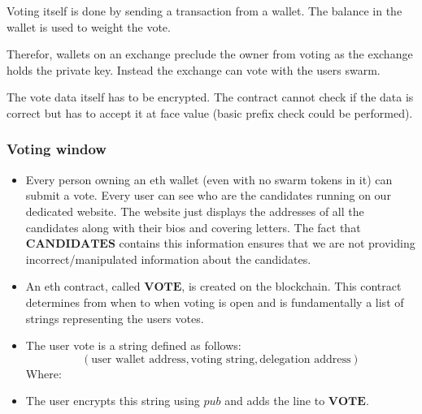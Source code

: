 \documentclass[submission, copyright,creativecommons,sharealike,noncommercial]{eptcs}
\begin{document}
			Voting itself is done by sending a transaction from a
			wallet. The balance in the wallet is used to weight the
			vote.

			Therefor, wallets on an exchange preclude the owner from
			voting as the exchange holds the private key. Instead the
			exchange can vote with the users swarm.

			The vote data itself has to be encrypted. The contract
			cannot check if the data is correct but has to accept
			it at face value (basic prefix check could be performed).

		\subsubsection{Voting window}
			\begin{itemize}
				\item Every person owning an eth wallet (even with no swarm tokens in it) can submit a vote. Every user can see who are the candidates running on our dedicated website. The website just displays the addresses of all the candidates along with their bios and covering letters. The fact that $\textbf{CANDIDATES}$ contains this information ensures that we are not providing incorrect/manipulated information about the candidates.
				
				\item An eth contract, called $\textbf{VOTE}$, is created on the blockchain. This contract determines from when to when voting is open and is fundamentally a list of strings representing the users votes.
				
				\item The user vote is a string defined as follows: 
				\[
				(\text{user wallet address}, \text{voting string}, \text{delegation address})
				\]
				Where:
			
				\item The user encrypts this string using $pub$ and adds the line to $\textbf{VOTE}$.
			\end{itemize}
		
\end{document}
